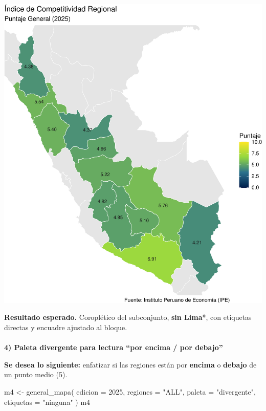 \documentclass[
  11pt,
  letterpaper,
  DIV=11,
  numbers=noendperiod]{scrartcl}
\makeatletter
\let\oldparagraph\paragraph
\renewcommand{\paragraph}{
    \@ifstar
      \xxxParagraphStar
      \xxxParagraphNoStar
  }
\newcommand{\xxxParagraphStar}[1]{\oldparagraph*{#1}\mbox{}}
\newcommand{\xxxParagraphNoStar}[1]{\oldparagraph{#1}\mbox{}}
\newenvironment{Shaded}{\begin{snugshade}}{\end{snugshade}}
\newcommand{\AttributeTok}[1]{\textcolor[rgb]{0.40,0.45,0.13}{#1}}
\newcommand{\DecValTok}[1]{\textcolor[rgb]{0.68,0.00,0.00}{#1}}
\newcommand{\FunctionTok}[1]{\textcolor[rgb]{0.28,0.35,0.67}{#1}}
\newcommand{\NormalTok}[1]{\textcolor[rgb]{0.00,0.23,0.31}{#1}}
\newcommand{\OtherTok}[1]{\textcolor[rgb]{0.00,0.23,0.31}{#1}}
\newcommand{\StringTok}[1]{\textcolor[rgb]{0.13,0.47,0.30}{#1}}
\makeatother
\begin{document}
\includegraphics{Manual_files/figure-pdf/unnamed-chunk-44-1.pdf}

\textbf{Resultado esperado.} Coroplético del subconjunto, \textbf{sin
Lima}*, con etiquetas directas y encuadre ajustado al bloque.

\paragraph{\texorpdfstring{\textbf{4) Paleta divergente para lectura
``por encima / por
debajo''}}{4) Paleta divergente para lectura ``por encima / por debajo''}}\label{paleta-divergente-para-lectura-por-encima-por-debajo}

\textbf{Se desea lo siguiente:} enfatizar si las regiones están por
\textbf{encima} o \textbf{debajo} de un punto medio (5).

\begin{Shaded}
\begin{Highlighting}[]
\NormalTok{m4 }\OtherTok{\textless{}{-}} \FunctionTok{general\_mapa}\NormalTok{(}
  \AttributeTok{edicion   =} \DecValTok{2025}\NormalTok{,}
  \AttributeTok{regiones  =} \StringTok{"ALL"}\NormalTok{,}
  \AttributeTok{paleta    =} \StringTok{"divergente"}\NormalTok{,}
  \AttributeTok{etiquetas =} \StringTok{"ninguna"}
\NormalTok{)}
\NormalTok{m4}
\end{Highlighting}
\end{Shaded}
\end{document}
